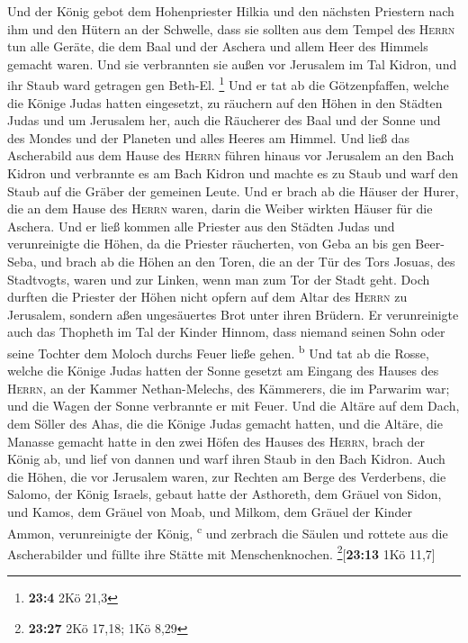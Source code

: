 Und der König gebot dem Hohenpriester Hilkia und den
nächsten Priestern nach ihm und den Hütern an der Schwelle, dass sie
sollten aus dem Tempel des \textsc{Herrn} tun alle Geräte, die dem Baal
und der Aschera und allem Heer des Himmels gemacht waren. Und sie
verbrannten sie außen vor Jerusalem im Tal Kidron, und ihr Staub ward
getragen gen Beth-El. \footnote{\textbf{23:4} 2Kö 21,3} 
Und er tat ab die Götzenpfaffen, welche die Könige Judas hatten
eingesetzt, zu räuchern auf den Höhen in den Städten Judas und um
Jerusalem her, auch die Räucherer des Baal und der Sonne und des Mondes
und der Planeten und alles Heeres am Himmel.  Und ließ das
Ascherabild aus dem Hause des \textsc{Herrn} führen hinaus vor Jerusalem
an den Bach Kidron und verbrannte es am Bach Kidron und machte es zu
Staub und warf den Staub auf die Gräber der gemeinen Leute.
 Und er brach ab die Häuser der Hurer, die an dem Hause
des \textsc{Herrn} waren, darin die Weiber wirkten Häuser für die
Aschera.  Und er ließ kommen alle Priester aus den Städten
Judas und verunreinigte die Höhen, da die Priester räucherten, von Geba
an bis gen Beer-Seba, und brach ab die Höhen an den Toren, die an der
Tür des Tors Josuas, des Stadtvogts, waren und zur Linken, wenn man zum
Tor der Stadt geht.  Doch durften die Priester der Höhen
nicht opfern auf dem Altar des \textsc{Herrn} zu Jerusalem, sondern aßen
ungesäuertes Brot unter ihren Brüdern.  Er verunreinigte
auch das Thopheth im Tal der Kinder Hinnom, dass niemand seinen Sohn
oder seine Tochter dem Moloch durchs Feuer ließe gehen.
\textsuperscript{b}  Und tat ab die Rosse, welche die
Könige Judas hatten der Sonne gesetzt am Eingang des Hauses des
\textsc{Herrn}, an der Kammer Nethan-Melechs, des Kämmerers, die im
Parwarim war; und die Wagen der Sonne verbrannte er mit Feuer.
 Und die Altäre auf dem Dach, dem Söller des Ahas, die
die Könige Judas gemacht hatten, und die Altäre, die Manasse gemacht
hatte in den zwei Höfen des Hauses des \textsc{Herrn}, brach der König
ab, und lief von dannen und warf ihren Staub in den Bach Kidron.
 Auch die Höhen, die vor Jerusalem waren, zur Rechten am
Berge des Verderbens, die Salomo, der König Israels, gebaut hatte der
Asthoreth, dem Gräuel von Sidon, und Kamos, dem Gräuel von Moab, und
Milkom, dem Gräuel der Kinder Ammon, verunreinigte der König,
\textsuperscript{c}  und zerbrach die Säulen und rottete
aus die Ascherabilder und füllte ihre Stätte mit Menschenknochen.
\footnote{\textbf{23:27} 2Kö 17,18; 1Kö 8,29}{[}\textbf{23:13} 1Kö
11,7{]}

